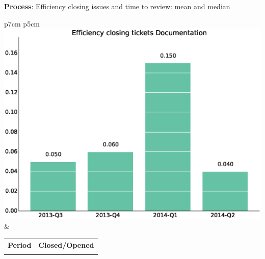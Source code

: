 \documentclass[a4wide,11pt]{report}
\begin{document}
\textbf{Process}: Efficiency closing issues and time to review: mean and median

\begin{tabular}{p{7cm} p{5cm}}
    \vspace{0pt} 
    \includegraphics[scale=.35]{figs/bmiDocumentation.eps}
    & 
    \vspace{0pt}
    \begin{tabular}{l|l}%
    \bfseries Period & \bfseries Closed/Opened %
    \csvreader[head to column names]{data/bmiDocumentation.csv}{}%
    {\\ & \bmi}
    \end{tabular}
\end{tabular}
\end{document}
